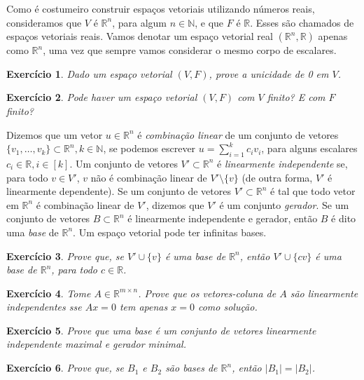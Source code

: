 \documentclass[]{article}
\newtheorem{exercicio}{Exercício}
\numberwithin{equation}{section}
\begin{document}
Como é costumeiro construir espaços vetoriais utilizando números reais, consideramos que $V$ é $\mathbb{R}^n$, para algum $n \in \mathbb{N}$, e que $F$ é $\mathbb{R}$. Esses são chamados de espaços vetoriais reais. Vamos denotar um espaço vetorial real $(\mathbb{R}^n, \mathbb{R})$ apenas como $\mathbb{R}^n$, uma vez que sempre vamos considerar o mesmo corpo de escalares.

\begin{exercicio}
	Dado um espaço vetorial $(V, F)$, prove a unicidade de 0 em $V$.
\end{exercicio}

\begin{exercicio}
	Pode haver um espaço vetorial $(V, F)$ com $V$ finito? E com $F$ finito?
\end{exercicio}

Dizemos que um vetor $u \in \mathbb{R}^n$ é \emph{combinação linear} de um conjunto de vetores $\{v_1, \dots, v_k\} \subset \mathbb{R}^n, k \in \mathbb{N}$, se podemos escrever $u = \sum_{i = 1}^{k} c_i v_i$, para alguns escalares $c_i \in \mathbb{R}, i \in [k]$. Um conjunto de vetores $V' \subset \mathbb{R}^n$ é \emph{linearmente independente} se, para todo $v \in V'$, $v$ não é combinação linear de $V' \setminus \{v\}$ (de outra forma, $V'$ é linearmente dependente). Se um conjunto de vetores $V' \subset \mathbb{R}^n$ é tal que todo vetor em $\mathbb{R}^n$ é combinação linear de $V'$, dizemos que $V'$ é um conjunto \emph{gerador}. Se um conjunto de vetores $B \subset \mathbb{R}^n$ é linearmente independente e gerador, então $B$ é dito uma \emph{base} de $\mathbb{R}^n$. Um espaço vetorial pode ter infinitas bases.

\begin{exercicio}
	Prove que, se $V' \cup \{v\}$ é uma base de $\mathbb{R}^n$, então $V' \cup \{cv\}$ é uma base de $\mathbb{R}^n$, para todo $c \in \mathbb{R}$.
\end{exercicio}

\begin{exercicio}
	Tome $A \in \mathbb{R}^{m \times n}$. Prove que os vetores-coluna de $A$ são linearmente independentes sse $Ax = 0$ tem apenas $x = 0$ como solução.
\end{exercicio}

\begin{exercicio}
	Prove que uma base é um conjunto de vetores linearmente independente maximal e gerador minimal.
\end{exercicio}

\begin{exercicio}
	Prove que, se $B_1$ e $B_2$ são bases de $\mathbb{R}^n$, então $|B_1| = |B_2|$.
\end{exercicio}
\end{document}
